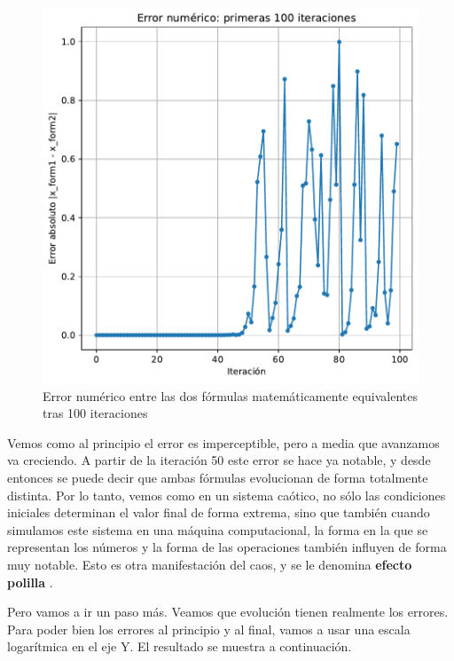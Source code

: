 \documentclass[
  10pt,
  a4paper,
  DIV=11,
  numbers=noendperiod,
  open=any]{scrreprt}
\numberwithin{equation}{chapter}
\numberwithin{equation}{section}
\renewcommand{\[}{\begin{equation}}
\renewcommand{\]}{\end{equation}}
\begin{document}
\begin{figure}[h]
  \centering
  \includegraphics[keepaspectratio]{01-logistica/lyapunov_files/figure-pdf/cell-8-output-1.pdf}
  \caption{Error numérico entre las dos fórmulas matemáticamente equivalentes tras 100 iteraciones}
\end{figure}  



Vemos como al principio el error es imperceptible, pero a media que
avanzamos va creciendo. A partir de la iteración 50 este error se hace
ya notable, y desde entonces se puede decir que ambas fórmulas
evolucionan de forma totalmente distinta. Por lo tanto, vemos como en un
sistema caótico, no sólo las condiciones iniciales determinan el valor
final de forma extrema, sino que también cuando simulamos este sistema
en una máquina computacional, la forma en la que se representan los
números y la forma de las operaciones también influyen de forma muy
notable. Esto es otra manifestación del caos, y se le denomina \textbf{efecto polilla} . 

Pero vamos a ir un paso más. Veamos que evolución tienen realmente los
errores. Para poder bien los errores al principio y al final, vamos a
usar una escala logarítmica en el eje Y. El resultado se muestra a
continuación.
\end{document}
